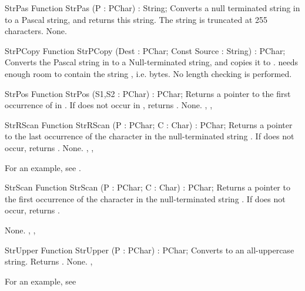 
\begin{function}{StrPas}
\Declaration
Function StrPas (P : PChar) : String;
\Description
Converts a null terminated string in  to a Pascal string, and returns
this string. The string is truncated at 255 characters.
\Errors
None.
\SeeAlso
\end{function}


\begin{function}{StrPCopy}
\Declaration
Function StrPCopy (Dest : PChar; Const Source : String) : PChar;
\Description
Converts the Pascal string in  to a Null-terminated 
string, and copies it to .  needs enough room to contain
the string , i.e.  bytes.
\Errors
No length checking is performed.
\SeeAlso
\end{function}


\begin{function}{StrPos}
\Declaration
Function StrPos (S1,S2 : PChar) : PChar;
\Description
Returns a pointer to the first occurrence of  in .
If  does not occur in , returns .
\Errors
None.
\SeeAlso
{}, , 
\end{function}


\begin{function}{StrRScan}
\Declaration
Function StrRScan (P : PChar; C : Char) : PChar;
\Description
Returns a pointer to the last occurrence of the character  in the
null-terminated string . If  does not occur, returns
.
\Errors
None.
\SeeAlso
{}, , 
\end{function}


For an example, see .


\begin{function}{StrScan}
\Declaration
Function StrScan (P : PChar; C : Char) : PChar;
\Description
Returns a pointer to the first occurrence of the character  in the
null-terminated string . If  does not occur, returns
.

\Errors
None.
\SeeAlso
{}, , 
\end{function}


\begin{function}{StrUpper}
\Declaration
Function StrUpper (P : PChar) : PChar;
\Description
Converts  to an all-uppercase string. Returns .
\Errors
None.
\SeeAlso
{}, 
\end{function}

For an example, see 
